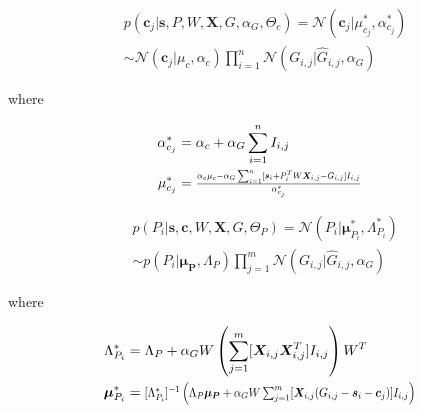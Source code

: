 \documentclass[10pt]{proc}
\begin{document}
\begin{mdframed}[style=eqbox]
\begin{align} \label{cpd-c}
    &p(\bm{c}_j | \bm{s}, P, W, \bm{X}, G, \alpha_G, \Theta_c)
        = \mathcal{N}(\bm{c}_j | \mu_{c_j}^*, \alpha_{c_j}^*) \\
        & \sim \mathcal{N}(\bm{c}_j | \mu_c, \alpha_c)
               \prod_{i=1}^n \mathcal{N}(G_{i,j} | \hat{G}_{i,j}, \alpha_G)
\end{align}

where

\begin{align}
    \alpha_{c_j}^* &= \begin{aligned}[t]
        \alpha_c + \alpha_G \sum_{i=1}^n I_{i,j}
    \end{aligned}\\
%
    \mu_{c_j}^* &= \begin{aligned}[t]
        \hstretch{0.8}{\vstretch{0.9}{
            \frac{\alpha_c\mu_c -
                  \alpha_G \sum_{i=1}^n
                      [\bm{s}_i + P_i^TW\bm{X}_{i,j} - G_{i,j} ] I_{i,j}}
                 {\alpha_{c_j}^*}}}
    \end{aligned}
\end{align}
\end{mdframed}


\begin{mdframed}[style=eqbox]
{\setlength{\mathindent}{0cm}
\begin{align} \label{cpd-P}
    &p(P_i | \bm{s}, \bm{c}, W, \bm{X}, G, \Theta_P) =
        \mathcal{N}(P_i | \bm{\mu}_{P_i}^*, \Lambda_{P_i}^*) \\
        & \sim p(P_i | \bm{\mu_P}, \Lambda_P)
            \prod_{j=1}^m \mathcal{N}(G_{i,j} | \hat{G}_{i,j}, \alpha_G)
\end{align}

where

\begin{align}
    \Lambda_{P_i}^* &= \begin{aligned}[t]
        \Lambda_P +
        \alpha_G W \left(
            \sum_{j=1}^m [\bm{X}_{i,j} \bm{X}_{i,j}^T ] I_{i,j}
        \right) W^T
    \end{aligned}\\
%
    \bm{\mu}_{P_i}^* &= \begin{aligned}[t]
        \vstretch{0.9}{\hstretch{0.8}{
            [\Lambda_{P_i}^*]^{-1} \left(
                \Lambda_P\bm{\mu_P} +
                \alpha_G W \sum_{j=1}^m
                    [\bm{X}_{i,j}(G_{i,j} - \bm{s}_i - \bm{c}_j)] I_{i,j}
            \right)}}
        \end{aligned}
\end{align}}
\end{mdframed}
\end{document}
